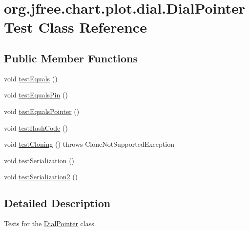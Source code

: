 \hypertarget{classorg_1_1jfree_1_1chart_1_1plot_1_1dial_1_1_dial_pointer_test}{}\section{org.\+jfree.\+chart.\+plot.\+dial.\+Dial\+Pointer\+Test Class Reference}
\label{classorg_1_1jfree_1_1chart_1_1plot_1_1dial_1_1_dial_pointer_test}
\subsection*{Public Member Functions}
\begin{DoxyCompactItemize}
\item 
void \mbox{\hyperlink{classorg_1_1jfree_1_1chart_1_1plot_1_1dial_1_1_dial_pointer_test_a3873479e2cb583f735490719bb008678}{test\+Equals}} ()
\item 
void \mbox{\hyperlink{classorg_1_1jfree_1_1chart_1_1plot_1_1dial_1_1_dial_pointer_test_a4c7bbb0b58046441e84ef2a6bb1d6206}{test\+Equals\+Pin}} ()
\item 
void \mbox{\hyperlink{classorg_1_1jfree_1_1chart_1_1plot_1_1dial_1_1_dial_pointer_test_a7f1236f3de4dbf64c9f5272a8dea0377}{test\+Equals\+Pointer}} ()
\item 
void \mbox{\hyperlink{classorg_1_1jfree_1_1chart_1_1plot_1_1dial_1_1_dial_pointer_test_a0aff1a156748dfe04cabccfc88a7a867}{test\+Hash\+Code}} ()
\item 
void \mbox{\hyperlink{classorg_1_1jfree_1_1chart_1_1plot_1_1dial_1_1_dial_pointer_test_a09b757cb5d31ebed5c6b08b054b25429}{test\+Cloning}} ()  throws Clone\+Not\+Supported\+Exception 
\item 
void \mbox{\hyperlink{classorg_1_1jfree_1_1chart_1_1plot_1_1dial_1_1_dial_pointer_test_a0b46592c56fb8d7e1bd57ab3d03a21bf}{test\+Serialization}} ()
\item 
void \mbox{\hyperlink{classorg_1_1jfree_1_1chart_1_1plot_1_1dial_1_1_dial_pointer_test_a4e890f1a227ad978a6082f447dcfbf67}{test\+Serialization2}} ()
\end{DoxyCompactItemize}


\subsection{Detailed Description}
Tests for the \mbox{\hyperlink{classorg_1_1jfree_1_1chart_1_1plot_1_1dial_1_1_dial_pointer}{Dial\+Pointer}} class. 

